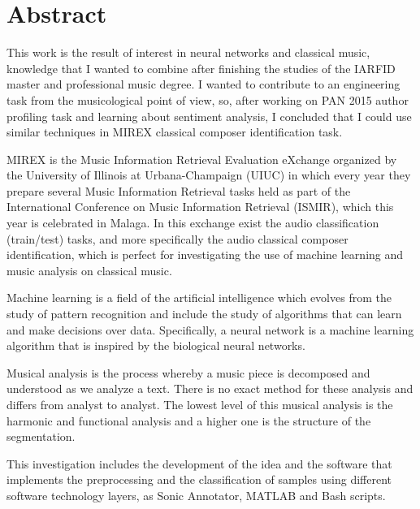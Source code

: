 \documentclass[a4paper,openany,oneside,12pt]{book}
\begin{document}
\chapter*{Abstract}

This work is the result of interest in neural networks and classical music, knowledge that I wanted to combine after finishing the studies of the IARFID master and professional music degree. I wanted to contribute to an engineering task from the musicological point of view, so, after working on PAN 2015 author profiling task and learning about sentiment analysis, I concluded that I could use similar techniques in MIREX classical composer identification task.

MIREX is the Music Information Retrieval Evaluation eXchange organized by the University of Illinois at Urbana-Champaign (UIUC) in which every year they prepare several Music Information Retrieval tasks held as part of the International Conference on Music Information Retrieval (ISMIR), which this year is celebrated in Malaga. In this exchange exist the audio classification (train/test) tasks, and more specifically the audio classical composer identification, which is perfect for investigating the use of machine learning and music analysis on classical music.

Machine learning is a field of the artificial intelligence which evolves from the study of pattern recognition and include the study of algorithms that can learn and make decisions over data. Specifically, a neural network is a machine learning algorithm that is inspired by the biological neural networks.

Musical analysis is the process whereby a music piece is decomposed and understood as we analyze a text. There is no exact method for these analysis and differs from analyst to analyst. The lowest level of this musical analysis is the harmonic and functional analysis and a higher one is the structure of the segmentation.

This investigation includes the development of the idea and the software that implements the preprocessing and the classification of samples using different software technology layers, as Sonic Annotator, MATLAB and Bash scripts.


\newpage
\thispagestyle{empty}
\mbox{}



\tableofcontents

\cleardoublepage
{}
\listoffigures
\end{document}
